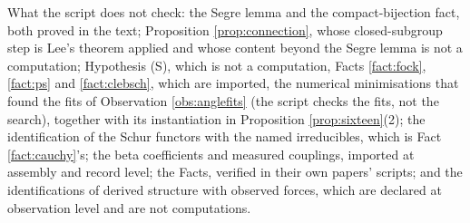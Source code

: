 \documentclass[11pt]{article}
\theoremstyle{definition}
\begin{document}
What the script does not check: the Segre lemma and the compact-bijection fact, both proved in the text; Proposition \ref{prop:connection}, whose closed-subgroup step is Lee's theorem applied and whose content beyond the Segre lemma is not a computation; Hypothesis (S), which is not a computation, Facts \ref{fact:fock}, \ref{fact:ps} and \ref{fact:clebsch}, which are imported, the numerical minimisations that found the fits of Observation \ref{obs:anglefits} (the script checks the fits, not the search), together with its instantiation in Proposition \ref{prop:sixteen}(2); the identification of the Schur functors with the named irreducibles, which is Fact \ref{fact:cauchy}'s; the beta coefficients and measured couplings, imported at assembly and record level; the Facts, verified in their own papers' scripts; and the identifications of derived structure with observed forces, which are declared at observation level and are not computations.
\end{document}

